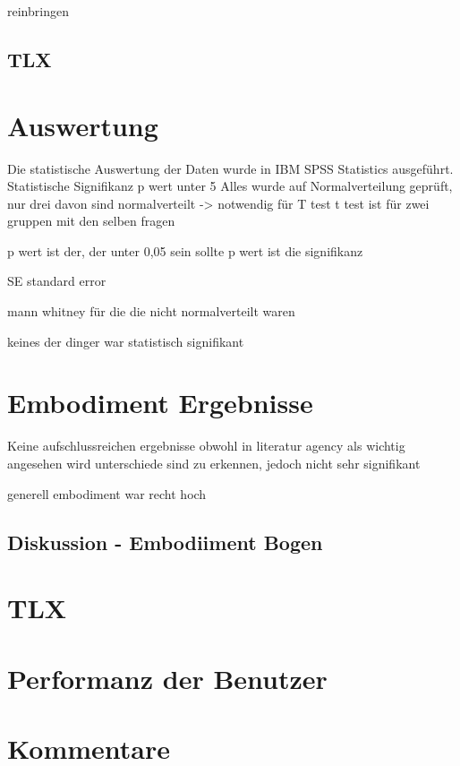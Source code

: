reinbringen


\subsection{TLX}


\section{Auswertung}
Die statistische Auswertung der Daten wurde in IBM SPSS Statistics ausgeführt.
Statistische Signifikanz p wert unter 5%
Alles wurde auf Normalverteilung geprüft, nur drei davon sind normalverteilt -> notwendig für T test
t test ist für zwei gruppen mit den selben fragen


p wert ist der, der unter 0,05 sein sollte
p wert ist die signifikanz

SE standard error

mann whitney für die die nicht normalverteilt waren

keines der dinger war statistisch signifikant


\section{Embodiment Ergebnisse}
Keine aufschlussreichen ergebnisse
obwohl in literatur agency als wichtig angesehen wird
unterschiede sind zu erkennen, jedoch nicht sehr signifikant

generell embodiment war recht hoch


\subsection{Diskussion - Embodiiment Bogen}

\section{TLX}

\section{Performanz der Benutzer}

\section{Kommentare}




















